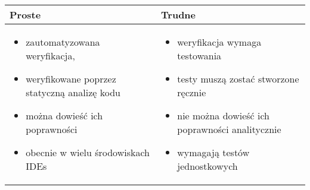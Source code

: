 \documentclass[../main.tex]{subfiles}
\begin{document}
    \begin{table}[H]
        \begin{center}
            \begin{tabular}{ p{8cm} p{8cm} }
                \textbf{Proste} & \textbf{Trudne}\\
                \toprule
                \begin{itemize}
                    \item zautomatyzowana weryfikacja,
                    \item weryfikowane poprzez statyczną analizę kodu
                    \item można dowieść ich poprawności
                    \item obecnie w wielu środowiskach IDEs
                \end{itemize}
                &
                \begin{itemize}
                    \item weryfikacja wymaga testowania
                    \item testy muszą zostać stworzone ręcznie
                    \item nie można dowieść ich poprawności analitycznie
                    \item wymagają testów jednostkowych
                \end{itemize}
            \end{tabular}
        \end{center}
    \end{table}
\end{document}
